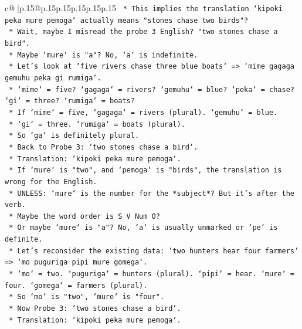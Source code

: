\documentclass{article}
\begin{document}
{\begin{supertabular}{c@{$\;$}|p{.15\linewidth}@{}p{.15\linewidth}p{.15\linewidth}p{.15\linewidth}p{.15\linewidth}p{.15\linewidth}}
{{{\texttt{                *   This implies the translation `kipoki peka mure pemoga` actually means "stones chase two birds"?} \\
\texttt{                *   Wait, maybe I misread the probe 3 English? "two stones chase a bird".} \\
\texttt{                *   Maybe `mure` is "a"? No, `a` is indefinite.} \\
\texttt{                *   Let's look at `five rivers chase three blue boats` => `mime gagaga gemuhu peka gi rumiga`.} \\
\texttt{                    *   `mime` = five? `gagaga` = rivers? `gemuhu` = blue? `peka` = chase? `gi` = three? `rumiga` = boats?} \\
\texttt{                    *   If `mime` = five, `gagaga` = rivers (plural). `gemuhu` = blue.} \\
\texttt{                    *   `gi` = three. `rumiga` = boats (plural).} \\
\texttt{                    *   So `ga` is definitely plural.} \\
\texttt{                *   Back to Probe 3: `two stones chase a bird`.} \\
\texttt{                *   Translation: `kipoki peka mure pemoga`.} \\
\texttt{                *   If `mure` is "two", and `pemoga` is "birds", the translation is wrong for the English.} \\
\texttt{                *   UNLESS: `mure` is the number for the *subject*? But it's after the verb.} \\
\texttt{                *   Maybe the word order is S V Num O?} \\
\texttt{                *   Or maybe `mure` is "a"? No, `a` is usually unmarked or `pe` is definite.} \\
\texttt{                *   Let's reconsider the existing data: `two hunters hear four farmers` => `mo puguriga pipi mure gomega`.} \\
\texttt{                    *   `mo` = two. `puguriga` = hunters (plural). `pipi` = hear. `mure` = four. `gomega` = farmers (plural).} \\
\texttt{                    *   So `mo` is "two", `mure` is "four".} \\
\texttt{                *   Now Probe 3: `two stones chase a bird`.} \\
\texttt{                    *   Translation: `kipoki peka mure pemoga`.} \\
}}}
\end{supertabular}}
\end{document}
